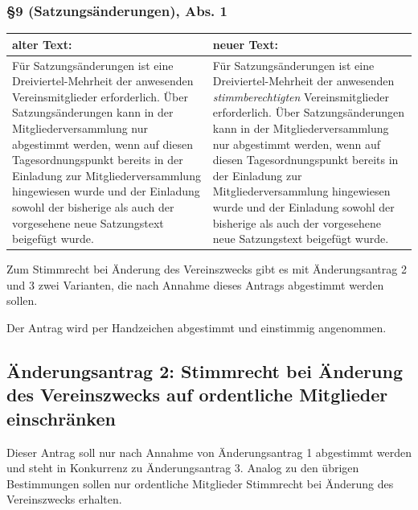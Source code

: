 \documentclass[a4paper,12pt]{scrartcl}
\begin{document}
\subsubsection*{§9 (Satzungsänderungen), Abs. 1}
\begin{longtable}[c]{@{}ll@{}}
\toprule
\begin{minipage}[b]{0.47\columnwidth}\raggedright\strut
alter Text:
\strut\end{minipage} &
\begin{minipage}[b]{0.47\columnwidth}\raggedright\strut
neuer Text:
\strut\end{minipage}\tabularnewline
\midrule
\endhead
\begin{minipage}[t]{0.47\columnwidth}\raggedright\strut
Für Satzungsänderungen ist eine Dreiviertel-Mehrheit der anwesenden
Vereinsmitglieder erforderlich. Über Satzungsänderungen kann in der
Mitgliederversammlung nur abgestimmt werden, wenn auf diesen
Tagesordnungspunkt bereits in der Einladung zur Mitgliederversammlung
hingewiesen wurde und der Einladung sowohl der bisherige als auch der
vorgesehene neue Satzungstext beigefügt wurde.
\strut\end{minipage} &
\begin{minipage}[t]{0.47\columnwidth}\raggedright\strut
Für Satzungsänderungen ist eine Dreiviertel-Mehrheit der anwesenden
\emph{stimmberechtigten} Vereinsmitglieder erforderlich. Über
Satzungsänderungen kann in der Mitgliederversammlung nur abgestimmt
werden, wenn auf diesen Tagesordnungspunkt bereits in der Einladung zur
Mitgliederversammlung hingewiesen wurde und der Einladung sowohl der
bisherige als auch der vorgesehene neue Satzungstext beigefügt wurde.
\strut\end{minipage}\tabularnewline
\bottomrule
\end{longtable}

Zum Stimmrecht bei Änderung des Vereinszwecks gibt es mit
Änderungsantrag 2 und 3 zwei Varianten, die nach Annahme dieses Antrags
abgestimmt werden sollen.

Der Antrag wird per Handzeichen abgestimmt und einstimmig angenommen.


\subsection{Änderungsantrag 2: Stimmrecht bei Änderung des Vereinszwecks
auf ordentliche Mitglieder einschränken}
Dieser Antrag soll nur nach Annahme von Änderungsantrag 1 abgestimmt
werden und steht in Konkurrenz zu Änderungsantrag 3. Analog zu den
übrigen Bestimmungen sollen nur ordentliche Mitglieder Stimmrecht bei
Änderung des Vereinszwecks erhalten.
\end{document}
